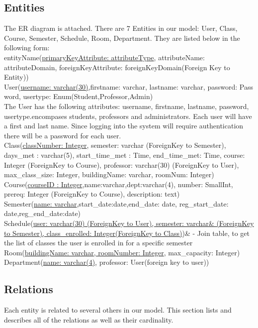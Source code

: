 \documentclass[11pt,oneside,a4paper]{article}
\begin{document}
\subsection{Entities}
The ER diagram is attached. There are 7 Entities in our model: User, Class, Course, Semester, Schedule, Room, Department.  They are listed below in the following form:
\\
entityName(\underline{primaryKeyAttribute: attributeType}, attributeName: attributeDomain, foreignKeyAttribute: foreignKeyDomain(Foreign Key to Entity))
\\
User(\underline{username: varchar(30)},firstname: varchar, lastname: varchar, password: Pass	word, usertype: Enum(Student,Professor,Admin)
\\
The User has the following attributes: username, firstname, lastname, 
password, usertype.encompases students, professors and administrators.  
Each user will have a first and last name. Since logging into the system 
will require authentication there will be a password for each user.
\\
Class(\underline{classNumber: Integer}, semester: varchar (ForeignKey to
Semester), days\_met : varchar(5), start\_time\_met : Time, end\_time\_met:
Time, course: Integer (ForeignKey to Course), professor: varchar(30)
(ForeignKey to User), max\_class\_size: Integer, buildingName: varchar,
roomNum: Integer)
\\
Course(\underline{courseID	: Integer},name:varchar,dept:varchar(4), 
number: SmallInt, prereq: Integer (ForeignKey to Course), description: text)
\\
Semester(\underline{name: varchar},start\_date:date,end\_date: date, 
reg\_start\_date: date,reg\_end\_date:date)
\\
Schedule(\underline{user: varchar(30) (ForeignKey to User), semester: varchar\&
(ForeignKey to Semester), class\_enrolled: Integer(ForeignKey to Class)})\& \<-
Join table, to get the list of classes the user is enrolled in for a specific
semester
\\
Room(\underline{buildingName: varchar, roomNumber: Integer}, max\_capacity: Integer)
Department(\underline{name: varchar(4)}, professor: User(foreign key to user))
\subsection{Relations} 
Each entity is related to several others in our model.  This section lists and describes 
all of the relations as well as their cardinality. 
\\
\end{document}
